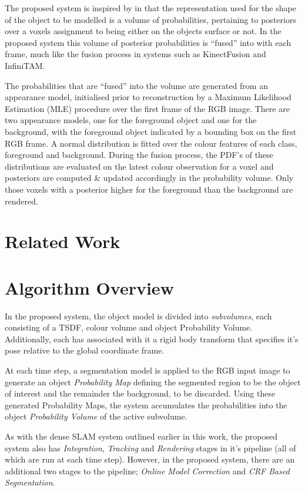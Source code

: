 The proposed system is inspired by\cite{Kolev2006} in that the representation
used for the shape of the object to be modelled is a volume of probabilities,
pertaining to posteriors over a voxels assignment to being either on the objects
surface or not. In the proposed system this volume of posterior probabilities is
``fused'' into with each frame, much like the fusion process in systems such as
KinectFusion\cite{Newcombe2011} and InfiniTAM\cite{Prisacariu2014}.

The probabilities that are ``fused'' into the volume are generated from an
appearance model, initialised prior to reconstruction by a Maximum Likelihood 
Estimation (MLE) \cite{MLE} procedure over the first frame of the RGB image. 
There are two appearance models, one for the foreground object and one for the 
background, with the foreground object indicated by a bounding box on the first 
RGB frame. A normal distribution is fitted over the colour features of each class, 
foreground and background. During the fusion process, the PDF's of these 
distributions are evaluated on the latest colour observation for a voxel and 
posteriors are computed \& updated accordingly in the probability volume. Only 
those voxels with a posterior higher for the foreground than the background 
are rendered.

\section{Related Work}
\label{sec:probobj_related_work}

\section{Algorithm Overview}
In the proposed system, the object model is divided into \textit{subvolumes}, 
each consisting of a TSDF, colour volume and object Probability Volume. 
Additionally, each has associated with it a rigid body transform that specifies 
it's pose relative to the global coordinate frame.

At each time step, a segmentation model is applied to the RGB input image to
generate an object \textit{Probability Map} defining the segmented region to be
the object of interest and the remainder the background, to be discarded. Using
these generated Probability Maps, the system accumulates the probabilities into
the object \textit{Probability Volume} of the active subvolume.

As with the dense SLAM system outlined earlier in this work, the proposed system
also has \textit{Integration}, \textit{Tracking} and \textit{Rendering}
stages in it's pipeline (all of which are run at each time step). However, in
the proposed system, there are an additional two stages to the pipeline;
\textit{Online Model Correction} and \textit{CRF Based Segmentation}.

